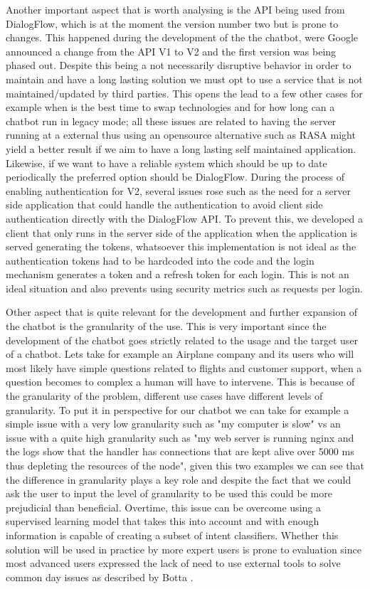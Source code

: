 Another important aspect that is worth analysing is the API being used from DialogFlow, which is at the moment the version number two but is prone to changes. This happened during the development of the the chatbot, were Google announced a change from the API V1 to V2 and the first version was being phased out. Despite this being a not necessarily disruptive behavior in order to maintain and have a long lasting solution we must opt to use a service that is not maintained/updated by third parties. This opens the lead to a few other cases for example when is the best time to swap technologies and for how long can a chatbot run in legacy mode; all these issues are related to having the server running at a external thus using an opensource alternative such as RASA might yield a better result if we aim to have a long lasting self maintained application. Likewise, if we want to have a reliable system which should be up to date periodically the preferred option should be DialogFlow. During the process of enabling authentication for V2, several issues rose such as the need for a server side application that could handle the authentication to avoid client side authentication directly with the DialogFlow API. To prevent this, we developed a client that only runs in the server side of the application when the application is served generating the tokens, whatsoever this implementation is not ideal as the authentication tokens had to be hardcoded into the code and the login mechanism generates a token and a refresh token for each login. This is not an ideal situation and also prevents using security metrics such as requests per login.

Other aspect that is quite relevant for the development and further expansion of the chatbot is the granularity of the use. This is very important since the development of the chatbot goes strictly related to the usage and the target user of a chatbot. Lets take for example an Airplane company and its users who will most likely have simple questions related to flights and customer support, when a question becomes to complex a human will have to intervene. This is because of the granularity of the problem, different use cases have different levels of granularity. To put it in perspective for our chatbot we can take for example a simple issue with a very low granularity such as "my computer is slow" vs an issue with a quite high granularity such as "my web server is running nginx and the logs show that the handler has connections that are kept alive over 5000 ms thus depleting the resources of the node", given this two examples we can see that the difference in granularity plays a key role and despite the fact that we could ask the user to input the level of granularity to be used this could be more prejudicial than beneficial. Overtime, this issue can be overcome using a supervised learning model that takes this into account and with enough information is capable of creating a subset of intent classifiers. Whether this solution will be used in practice by more expert users is prone to evaluation since most advanced users expressed the lack of need to use external tools to solve common day issues as described by Botta \cite{usageSecurity}.

